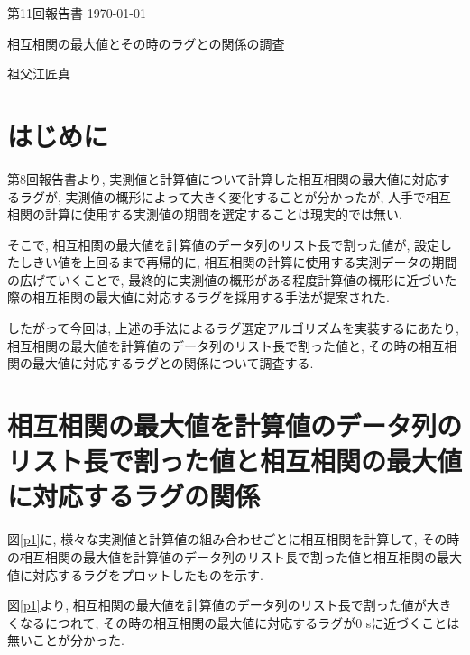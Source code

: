 \documentclass[a4j,12pt,]{jarticle}
\begin{document}
{\noindent\small 第11回報告書 \hfill\today}
\begin{center}
  {\Large 相互相関の最大値とその時のラグとの関係の調査}
\end{center}
\begin{flushright}
  祖父江匠真 \\
\end{flushright}

\section{はじめに}
第8回報告書より, 実測値と計算値について計算した相互相関の最大値に対応するラグが, 実測値の概形によって大きく変化することが分かったが, 人手で相互相関の計算に使用する実測値の期間を選定することは現実的では無い.

そこで, 相互相関の最大値を計算値のデータ列のリスト長で割った値が, 設定したしきい値を上回るまで再帰的に, 相互相関の計算に使用する実測データの期間の広げていくことで, 最終的に実測値の概形がある程度計算値の概形に近づいた際の相互相関の最大値に対応するラグを採用する手法が提案された.

したがって今回は, 上述の手法によるラグ選定アルゴリズムを実装するにあたり, 相互相関の最大値を計算値のデータ列のリスト長で割った値と, その時の相互相関の最大値に対応するラグとの関係について調査する.

\section{相互相関の最大値を計算値のデータ列のリスト長で割った値と相互相関の最大値に対応するラグの関係}
図\ref{p1}に, 様々な実測値と計算値の組み合わせごとに相互相関を計算して, その時の相互相関の最大値を計算値のデータ列のリスト長で割った値と相互相関の最大値に対応するラグをプロットしたものを示す.

図\ref{p1}より, 相互相関の最大値を計算値のデータ列のリスト長で割った値が大きくなるにつれて, その時の相互相関の最大値に対応するラグが0 \si{\second}に近づくことは無いことが分かった.
\end{document}
